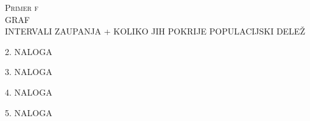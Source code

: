 \documentclass[a4paper,12pt]{article}
\begin{document}

\noindent
\textsc{Primer f}
\\
GRAF 
\\
INTERVALI ZAUPANJA + KOLIKO JIH POKRIJE POPULACIJSKI DELEŽ


\noindent
\textsc{\large{2. NALOGA}}


\noindent
\textsc{\large{3. NALOGA}}


\noindent
\textsc{\large{4. NALOGA}}


\noindent
\textsc{\large{5. NALOGA}}

\end{document}
